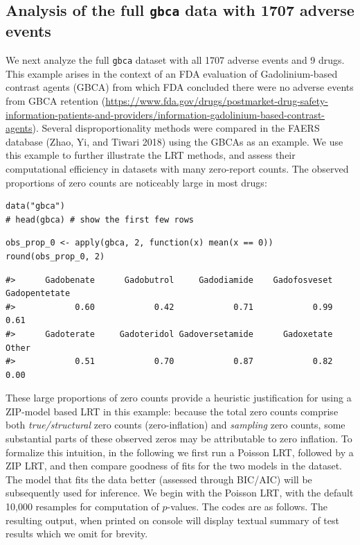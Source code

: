 \hypertarget{analysis-of-the-full-gbca-data-with-1707-adverse-events}{%
\subsection{\texorpdfstring{Analysis of the full \texttt{gbca} data with 1707 adverse events}{Analysis of the full gbca data with 1707 adverse events}}\label{analysis-of-the-full-gbca-data-with-1707-adverse-events}}

We next analyze the full \texttt{gbca} dataset with all 1707 adverse events and 9 drugs. This example arises in the context of an FDA evaluation of Gadolinium-based contrast agents (GBCA) from which FDA concluded there were no adverse events from GBCA retention (\url{https://www.fda.gov/drugs/postmarket-drug-safety-information-patients-and-providers/information-gadolinium-based-contrast-agents}). Several disproportionality methods were compared in the FAERS database (Zhao, Yi, and Tiwari 2018) using the GBCAs as an example. We use this example to further illustrate the LRT methods, and assess their computational efficiency in datasets with many zero-report counts. The observed proportions of zero counts are noticeably large in most drugs:

\begin{verbatim}
data("gbca")
# head(gbca) # show the first few rows
\end{verbatim}

\begin{verbatim}
obs_prop_0 <- apply(gbca, 2, function(x) mean(x == 0))
round(obs_prop_0, 2)
\end{verbatim}

\begin{verbatim}
#>      Gadobenate      Gadobutrol     Gadodiamide    Gadofosveset   Gadopentetate 
#>            0.60            0.42            0.71            0.99            0.61 
#>      Gadoterate     Gadoteridol Gadoversetamide      Gadoxetate           Other 
#>            0.51            0.70            0.87            0.82            0.00
\end{verbatim}

\noindent These large proportions of zero counts provide a heuristic justification for using a ZIP-model based LRT in this example: because the total zero counts comprise both \emph{true/structural} zero counts (zero-inflation) and \emph{sampling} zero counts, some substantial parts of these observed zeros may be attributable to zero inflation. To formalize this intuition, in the following we first run a Poisson LRT, followed by a ZIP LRT, and then compare goodness of fits for the two models in the dataset. The model that fits the data better (assessed through BIC/AIC) will be subsequently used for inference. We begin with the Poisson LRT, with the default 10,000 resamples for computation of \(p\)-values. The codes are as follows. The resulting output, when printed on console will display textual summary of test results which we omit for brevity.

